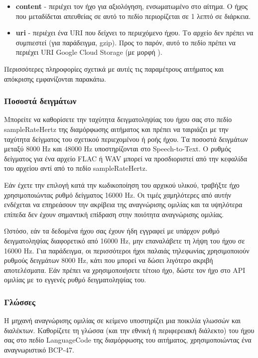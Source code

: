 \documentclass[oneside, 12pt]{book}
\begin{document}
\begin{itemize}
  \item \textbf{content} - περιέχει τον ήχο για αξιολόγηση, ενσωματωμένο στο αίτημα. Ο ήχος που μεταδίδεται απευθείας σε αυτό το πεδίο περιορίζεται σε 1 λεπτό σε διάρκεια.
  \item \textbf{uri} - περιέχει ένα URI που δείχνει το περιεχόμενο ήχου. Το αρχείο δεν πρέπει να συμπιεστεί (για παράδειγμα, gzip). Προς το παρόν, αυτό το πεδίο πρέπει να περιέχει URI Google Cloud Storage (με μορφή ).
\end{itemize}
Περισσότερες πληροφορίες σχετικά με αυτές τις παραμέτρους αιτήματος και απόκρισης εμφανίζονται παρακάτω.
\subsubsection{Ποσοστά δειγμάτων}
Μπορείτε να καθορίσετε την ταχύτητα δειγματοληψίας του ήχου σας στο πεδίο sampleRateHertz της διαμόρφωσης αιτήματος και πρέπει να ταιριάζει με την ταχύτητα δείγματος του σχετικού περιεχομένου ή ροής ήχου. Τα ποσοστά δειγμάτων μεταξύ 8000 Hz και 48000 Hz υποστηρίζονται στο Speech-to-Text. Ο ρυθμός δείγματος για ένα αρχείο FLAC ή WAV μπορεί να προσδιοριστεί από την κεφαλίδα του αρχείου αντί από το πεδίο sampleRateHertz.

Εάν έχετε την επιλογή κατά την κωδικοποίηση του αρχικού υλικού, τραβήξτε ήχο χρησιμοποιώντας ρυθμό δείγματος 16000 Hz. Οι τιμές χαμηλότερες από αυτήν ενδέχεται να επηρεάσουν την ακρίβεια της αναγνώρισης ομιλίας και τα υψηλότερα επίπεδα δεν έχουν σημαντική επίδραση στην ποιότητα αναγνώρισης ομιλίας.

Ωστόσο, εάν τα δεδομένα ήχου σας έχουν ήδη εγγραφεί με υπάρχον ρυθμό δειγματοληψίας διαφορετικό από 16000 Hz, μην επαναλάβετε τη λήψη του ήχου σε 16000 Hz. Για παράδειγμα, οι περισσότεροι ήχοι παλαιάς τηλεφωνίας χρησιμοποιούν ρυθμούς δειγμάτων 8000 Hz, κάτι που μπορεί να δώσει λιγότερο ακριβή αποτελέσματα. Εάν πρέπει να χρησιμοποιήσετε τέτοιο ήχο, δώστε τον ήχο στο API ομιλίας με το εγγενές ρυθμό δειγματοληψίας του.
\subsubsection{Γλώσσες}
Η μηχανή αναγνώρισης ομιλίας σε κείμενο υποστηρίζει μια ποικιλία γλωσσών και διαλέκτων. Καθορίζετε τη γλώσσα (και την εθνική ή περιφερειακή διάλεκτο) του ήχου σας στο πεδίο LanguageCode της διαμόρφωσης του αιτήματος, χρησιμοποιώντας ένα αναγνωριστικό BCP-47.
\end{document}
